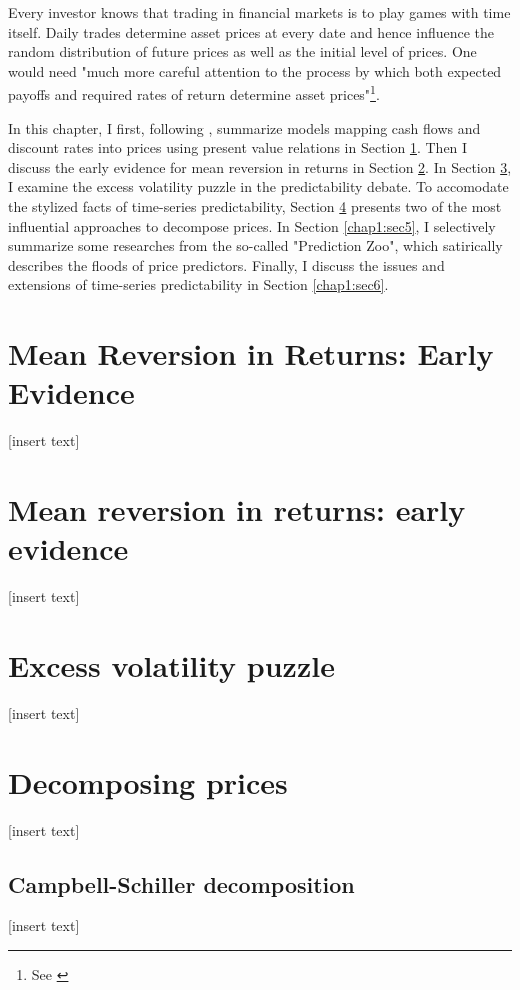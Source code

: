 \minitoc

\vspace{0.5cm}
Every investor knows that trading in financial markets is to play
games with time itself. Daily trades determine asset prices at every date and hence
influence the random distribution of future prices as well as the initial
level of prices. One would need "much more careful attention to the process
by which both expected payoffs and required rates of return determine
asset prices"\footnote{See \citet[p.~121]{campbell2017financial}}.

In this chapter, I first, following \citet[Chapter~5]{campbell2017financial}, summarize models 
mapping cash flows and discount rates into prices using present value relations in Section \ref{chap1:sec1}.
Then I discuss the early evidence for mean reversion in returns in Section \ref{chap1:sec2}.
In Section \ref{chap1:sec3}, I examine the excess volatility puzzle in the predictability debate.
To accomodate the stylized facts of time-series predictability, Section \ref{chap1:sec4}
presents two of the most influential approaches to decompose prices. In Section \ref{chap1:sec5},
I selectively summarize some researches from the so-called "Prediction Zoo", which satirically 
describes the floods of price predictors. Finally, I discuss the issues and extensions of time-series
predictability in Section \ref{chap1:sec6}.


\section{Mean Reversion in Returns: Early Evidence}\label{chap1:sec1}
[insert text]

\section{Mean reversion in returns: early evidence}\label{chap1:sec2}
[insert text]

\section{Excess volatility puzzle}\label{chap1:sec3}
[insert text]

\section{Decomposing prices}\label{chap1:sec4}
[insert text]

\subsection{Campbell-Schiller decomposition}\label{chap1:sec4:ssec1}
[insert text]

